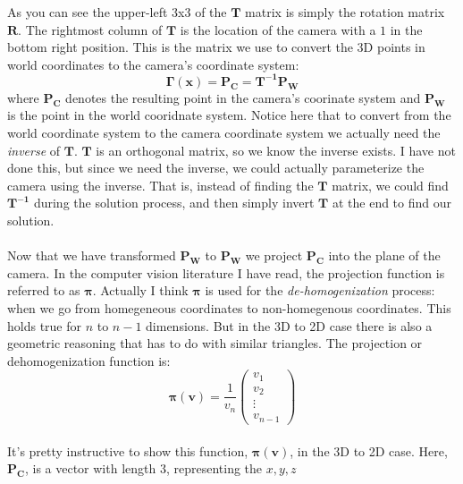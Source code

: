 \documentclass{article}
\begin{document}
As you can see the upper-left 3x3 of the $\mathbf{T}$ matrix is simply
the rotation matrix $\mathbf{R}$.  The rightmost column of
$\mathbf{T}$ is the location of the camera with a $1$ in the bottom
right position.  This is the matrix we use to convert the 3D points in
world coordinates to the camera's coordinate system:
\\
\begin{equation}
  \label{eq:pose-composition}
  \mathbf{\Gamma}(\mathbf{x}) = \mathbf{P_{C}} = \mathbf{T^{-1}}\mathbf{P_{W}}
\end{equation}
where $\mathbf{P_{C}}$ denotes the resulting point in the camera's
coorinate system and $\mathbf{P_{W}}$ is the point in the world
cooridnate system.  Notice here that to convert from the world
coordinate system to the camera coordinate system we actually need the
\emph{inverse} of $\mathbf{T}$.  $\mathbf{T}$ is an orthogonal matrix,
so we know the inverse exists.  I have not done this, but since we
need the inverse, we could actually parameterize the camera using the
inverse.  That is, instead of finding the $\mathbf{T}$ matrix, we
could find $\mathbf{T^{-1}}$ during the solution process, and then
simply invert $\mathbf{T}$ at the end to find our solution.
\\
\\
Now that we have transformed $\mathbf{P_{W}}$ to $\mathbf{P_{W}}$ we
project $\mathbf{P_{C}}$ into the plane of the camera.  In the
computer vision literature I have read, the projection function is
referred to as $\boldsymbol{\pi}$.  Actually I think
$\boldsymbol{\pi}$ is used for the \emph{de-homogenization} process:
when we go from homegeneous coordinates to non-homegenous coordinates.
This holds true for $n$ to $n-1$ dimensions.  But in the 3D to 2D case
there is also a geometric reasoning that has to do with similar
triangles.  The projection or dehomogenization function is:
\begin{equation}
  \label{eq:dehomog}
  \boldsymbol{\pi}(\mathbf{v}) =  \frac{1}{v_n} \left(
  \begin{array}{c}
    v_1 \\
    v_2 \\
    \vdots \\
    v_{n-1}
  \end{array}
  \right)
\end{equation}
\\
It's pretty instructive to show this function,
$\boldsymbol{\pi}(\mathbf{v})$, in the 3D to 2D case.  Here,
$\mathbf{P_C}$, is a vector with length 3, representing the $x, y, z$
\end{document}

